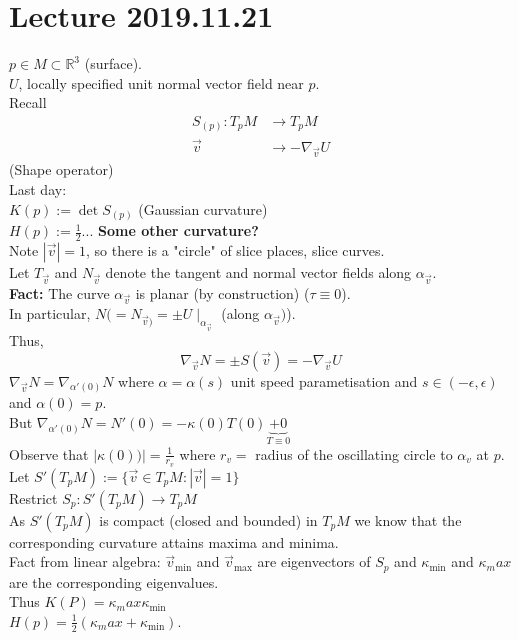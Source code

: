 \documentclass{article}
\newcommand{\R}{\mathbb{R}}
\newcommand{\abs}[1]{\left|#1\right|}
\theoremstyle{definition}
\theoremstyle{remark}
\theoremstyle{example}
\begin{document}
	\section*{Lecture 2019.11.21}
	$p \in M \subset \R^3$ (surface).\\
	$U$, locally specified unit normal vector field near $p$.\\
	Recall \begin{align*}
	S_{(p)}:T_pM& \to T_pM\\
	\vec{v} &\to -\nabla_{\vec{v}}U
	\end{align*}
	(Shape operator)\\
	Last day:\\
	$K(p):= \det S_{(p)}$ (Gaussian curvature)\\
	$H(p):= \frac{1}{2} ... $ \textbf{Some other curvature?}\\
	Note $\abs{\vec{v}}=1$, so there is a "circle" of slice places, slice curves.\\
	Let $T_{\vec{v}}$ and $N_{\vec{v}}$ denote the tangent and normal vector fields along $\alpha_{\vec{v}}$.\\
	\textbf{Fact:} The curve $\alpha_{\vec{v}}$ is planar (by construction) ($\tau \equiv 0$).\\
	In particular, $N(=N_{\vec{v})}= \pm U \mid_{\alpha_{\vec{v}}}$ (along $\alpha_{\vec{v}})$).\\
	Thus, \[\nabla_{\vec{v}}N=\pm S(\vec{v}) = - \nabla_{\vec{v}}U \] $\nabla_{\vec{v}}N=\nabla_{\alpha'(0)}N$ where $\alpha=\alpha(s)$ unit speed parametisation and $s \in (-\epsilon,\epsilon)$ and $\alpha(0)=p$.\\
	But $\nabla_{\alpha'(0)}N=N'(0)=-\kappa(0)T(0) \underbrace{+0}_{T \equiv 0}$\\
	Observe that $\abs{\kappa(0))}=\frac{1}{r_v}$ where $r_v=$ radius of the oscillating circle to $\alpha_v$ at $p$.\\
	Let $S'(T_pM) := \{ \vec{v} \in T_pM:\abs{\vec{v}}=1\}$\\
	Restrict $S_p:S'(T_pM) \to T_pM$\\
	As $S'(T_pM)$ is compact (closed and bounded) in $T_pM$ we know that the corresponding curvature attains maxima and minima.\\
	Fact from linear algebra: $\vec{v}_{\min}$ and $\vec{v}_{\max}$ are eigenvectors of $S_p$ and $\kappa_{\min}$ and $\kappa_max$ are the corresponding eigenvalues.\\
	Thus $K(P)=\kappa_max \kappa_{\min}$\\
	$H(p)=\frac{1}{2}(\kappa_max+\kappa_{\min})$.\\
\end{document}
